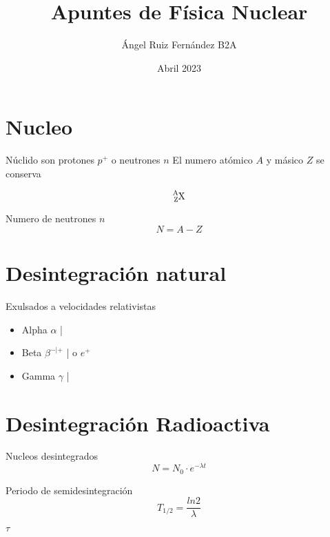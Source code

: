 \documentclass[12pt, letterpaper, twoside]{article}
\title{Apuntes de Física Nuclear}
\author{Ángel Ruiz Fernández B2A}
\date{Abril 2023}
\begin{document}
	\maketitle
	
	\section{Nucleo}
	Núclido son protones $p^+$ o neutrones $n$
	El numero atómico $A$ y másico $Z$ se conserva
	
	\begin{equation}
		\ce{_{Z}^{A}X}
	\end{equation}

	Numero de neutrones $n$
	\begin{equation}
		N = A - Z
	\end{equation}

	\section{Desintegración natural}
	Exulsados a velocidades relativistas
	\begin{itemize}
		\item Alpha $\alpha$ | 
		\item Beta $\beta^{-|+}$ |  o $e^+$
		
		\item Gamma $\gamma$ | 
	\end{itemize}

	\section{Desintegración Radioactiva}
	
	Nucleos desintegrados
	\begin{equation}
		N = N_0 \cdot e^{-\lambda t}
	\end{equation}

	Periodo de semidesintegración
	\begin{equation}
		T_{1/2} = \frac{ln 2}{\lambda}
	\end{equation}

$\tau$
\end{document}

